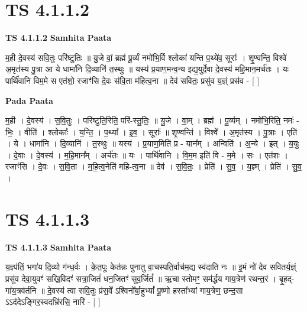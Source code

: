 \documentclass[17pt]{extarticle}
\begin{document}
\section{ TS 4.1.1.2 }

\textbf{TS 4.1.1.2 } \newline
\textbf{Samhita Paata} \newline

म॒ही दे॒वस्य॑ सवि॒तुः परि॑ष्टुतिः ॥ यु॒जे वां॒ ब्रह्म॑ पू॒र्व्यं नमो॑भि॒र्वि श्लोका॑ यन्ति प॒थ्ये॑व॒ सूराः᳚ । शृ॒ण्वन्ति॒ विश्वे॑ अ॒मृत॑स्य पु॒त्रा आ ये धामा॑नि दि॒व्यानि॑ त॒स्थुः ॥ यस्य॑ प्र॒याण॒मन्व॒न्य इद्य॒युर्दे॒वा दे॒वस्य॑ महि॒मान॒मर्च॑तः । यः पार्थि॑वानि विम॒मे स एत॑शो॒ रजाꣳ॑सि दे॒वः स॑वि॒ता म॑हित्व॒ना ॥ देव॑ सवितः॒ प्रसु॑व य॒ज्ञ्ं प्रस॑व - [  ] \newline

\textbf{Pada Paata} \newline

म॒ही । दे॒वस्य॑ । स॒वि॒तुः । परि॑ष्टुति॒रिति॒ परि॑-स्तु॒तिः॒ ॥ यु॒जे । वा॒म् । ब्रह्म॑ । पू॒र्व्यम् । नमो॑भि॒रिति॒ नमः॑ - भिः॒ । वीति॑ । श्लोकाः᳚ । य॒न्ति॒ । प॒थ्या᳚ । इ॒व॒ । सूराः᳚ ॥ शृ॒ण्वन्ति॑ । विश्वे᳚ । अ॒मृत॑स्य । पु॒त्राः । एति॑ । ये । धामा॑नि । दि॒व्यानि॑ । त॒स्थुः ॥ यस्य॑ । प्र॒याण॒मिति॑ प्र - यान᳚म् । अन्विति॑ । अ॒न्ये । इत् । य॒युः । दे॒वाः । दे॒वस्य॑ । म॒हि॒मान᳚म् । अर्च॑तः ॥ यः । पार्थि॑वानि । वि॒म॒म इति॑ वि - म॒मे । सः । एत॑शः । रजाꣳ॑सि । दे॒वः । स॒वि॒ता । म॒हि॒त्व॒नेति॑ महि-त्व॒ना ॥ देव॑ । स॒वि॒तः॒ । प्रेति॑ । सु॒व॒ । य॒ज्ञ्म् । प्रेति॑ । सु॒व॒ ।  \newline





\section{ TS 4.1.1.3 }

\textbf{TS 4.1.1.3 } \newline
\textbf{Samhita Paata} \newline

य॒ज्ञ्प॑तिं॒ भगा॑य दि॒व्यो ग॑न्ध॒र्वः । के॒त॒पूः केत॑न्नः पुनातु वा॒चस्पति॒र्वाच॑म॒द्य स्व॑दाति नः ॥ इ॒मं नो॑ देव सवितर्य॒ज्ञ्ं प्रसु॑व देवा॒युवꣳ॑ सखि॒विदꣳ॑ सत्रा॒जितं॑ धन॒जितꣳ॑ सुव॒र्जितं᳚ ॥ ऋ॒चा स्तोमꣳ॒॒ सम॑र्द्धय गाय॒त्रेण॑ रथन्त॒रं । बृ॒हद्-गा॑य॒त्रव॑र्तनि ॥ दे॒वस्य॑ त्वा सवि॒तुः प्र॑स॒वे᳚ ऽश्विनो᳚र्बा॒हुभ्यां᳚ पू॒ष्णो हस्ता᳚भ्यां गाय॒त्रेण॒ छन्द॒सा ऽऽद॑देऽङ्गिर॒स्वदभ्रि॑रसि॒ नारि॑ - [  ] \newline
\end{document}
